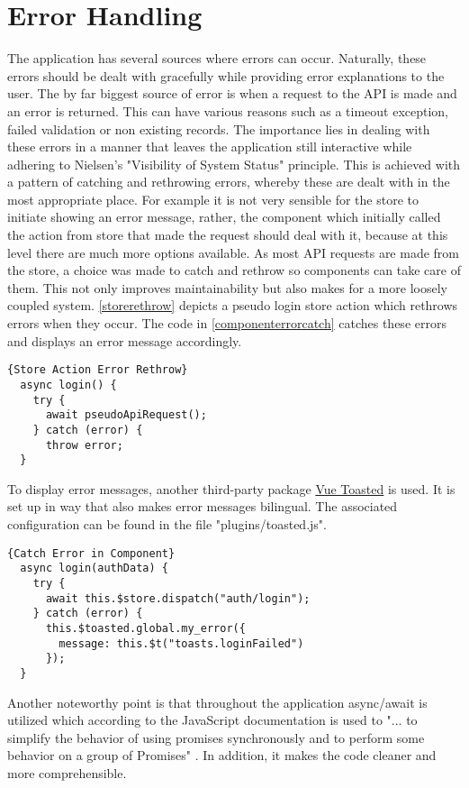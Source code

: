 \section{Error Handling}
The application has several sources where errors can occur. Naturally, these errors should be dealt with gracefully while providing error explanations to the user. The by far biggest source of error is when a request to the API is made and an error is returned. This can have various reasons such as a timeout exception, failed validation or non existing records. The importance lies in dealing with these errors in a manner that leaves the application still interactive while adhering to Nielsen's "Visibility of System Status" principle. This is achieved with a pattern of catching and rethrowing errors, whereby these are dealt with in the most appropriate place. For example it is not very sensible for the store to initiate showing an error message, rather, the component which initially called the action from store that made the request should deal with it, because at this level there are much more options available. As most API requests are made from the store, a choice was made to catch and rethrow so components can take care of them. This not only improves maintainability but also makes for a more loosely coupled system. \autoref{storerethrow} depicts a pseudo login store action which rethrows errors when they occur. The code in \autoref{componenterrorcatch} catches these errors and displays an error message accordingly. \newline

\begin{lstlisting}[caption=Store Action Error Rethrow, captionpos=b, style=htmlcssjs, label=storerethrow]{Store Action Error Rethrow}
  async login() {
    try {
      await pseudoApiRequest();
    } catch (error) {
      throw error;
  }
\end{lstlisting}

To display error messages, another third-party package \href{https://github.com/shakee93/vue-toasted}{Vue Toasted} is used. It is set up in way that also makes error messages bilingual. The associated configuration can be found in the file "plugins/toasted.js". \newline

\begin{lstlisting}[caption=Catch Error in Component, captionpos=b, style=htmlcssjs, label=componenterrorcatch]{Catch Error in Component}
  async login(authData) {
    try {
      await this.$store.dispatch("auth/login");
    } catch (error) {
      this.$toasted.global.my_error({
        message: this.$t("toasts.loginFailed")
      });
  }
\end{lstlisting}

Another noteworthy point is that throughout the application async/await is utilized which according to the JavaScript documentation is used to "... to simplify the behavior of using promises synchronously and to perform some behavior on a group of Promises" \cite{JavaCriptDoc:online}. In addition, it makes the code cleaner and more comprehensible.
